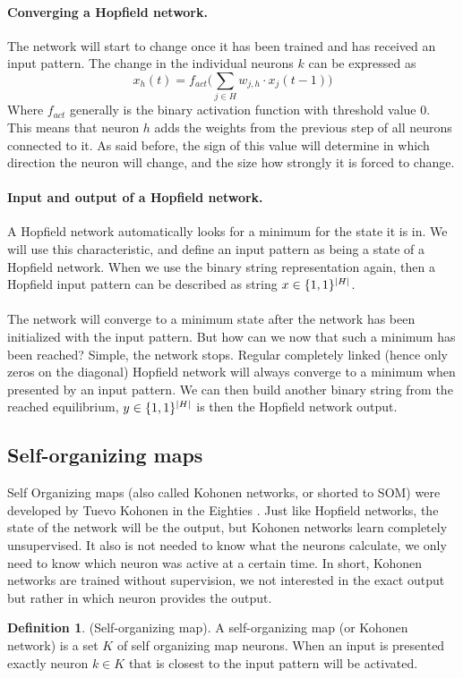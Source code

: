 \documentclass[pdftex,a4paper,12pt,twoside]{report}
\theoremstyle{plain} \newtheorem{theorem}{Theorem} \newtheorem{proposition}{Proposition} \newtheorem{lemma}{Lemma} \newtheorem*{corollary}{Corollary}
\theoremstyle{definition} \newtheorem{definition}{Definition} \newtheorem{conjecture}{Conjecture} \newtheorem*{example}{Example} \newtheorem{algorithm}{Algorithm}
\theoremstyle{remark} \newtheorem*{remark}{Remark} \newtheorem*{note}{Note} \newtheorem{case}{Case}
\begin{document}
\paragraph{Converging a Hopfield network.}
The network will start to change once it has been trained and has received an input pattern. The change in the individual neurons $k$ can be expressed as
\begin{equation}
x_h(t) = f_{act} \bigg(\sum_{j \in H} w_{j,h} \cdot x_j(t-1)\bigg)
\end{equation} Where $f_{act}$ generally is the binary activation function with threshold value 0.\\This means that neuron $h$ adds the weights from the previous step of all neurons connected to it. As said before, the sign of this value will determine in which direction the neuron will change, and the size how strongly it is forced to change. 
\paragraph{Input and output of a Hopfield network.} A Hopfield network automatically looks for a minimum for the state it is in. We will use this characteristic, and define an input pattern as being a state of a Hopfield network. When we use the binary string representation again, then a Hopfield input pattern can be described as string $x \in \{\-1,1\}^{|H|}$.\\\\The network will converge to a minimum state after the network has been initialized with the input pattern. But how can we now that such a minimum has been reached? Simple, the network stops. Regular completely linked (hence only zeros on the diagonal) Hopfield network will always converge to a minimum when presented by an input pattern. We can then build another binary string from the reached equilibrium, $y \in \{\-1,1\}^{|H|}$ is then the Hopfield network output.
\subsection{Self-organizing maps}
Self Organizing maps (also called Kohonen networks, or shorted to SOM) were developed by Tuevo Kohonen in the Eighties  \citep{Kohonen1982}. Just like Hopfield networks, the state of the network will be the output, but Kohonen networks learn completely unsupervised. It also is not needed to know what the neurons calculate, we only need to know which neuron was active at a certain time. In short, Kohonen networks are trained without supervision, we not interested in the exact output but rather in which neuron provides the output.
\begin{definition}
(Self-organizing map). A self-organizing map (or Kohonen network) is a set $K$ of self organizing map neurons. When an input is presented exactly neuron $k \in K$ that is closest to the input pattern will be activated.
\end{definition}
\end{document}
